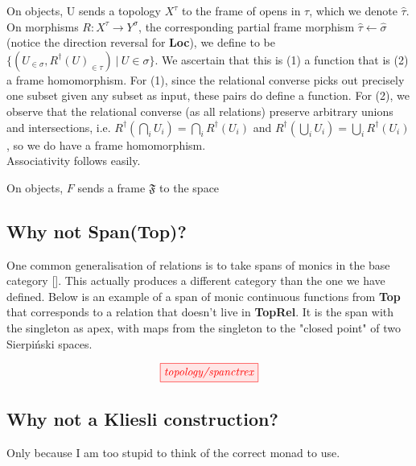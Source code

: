 \begin{defn}
On objects, U sends a topology $X^\tau$ to the frame of opens in $\tau$, which we denote $\hat{\tau}$.\\
On morphisms $R: X^\tau \rightarrow Y^\sigma$, the corresponding partial frame morphism $\hat{\tau} \leftarrow \hat{\sigma}$ (notice the direction reversal for \textbf{Loc}), we define to be $\{(U_{\in \sigma},R^\dagger(U)_{\in \tau}) \ | \ U \in \sigma\}$. We ascertain that this is (1) a function that is (2) a frame homomorphism. For (1), since the relational converse picks out precisely one subset given any subset as input, these pairs do define a function. For (2), we observe that the relational converse (as all relations) preserve arbitrary unions and intersections, i.e. $R^\dagger(\bigcap\limits_i U_i) = \bigcap\limits_i R^\dagger(U_i)$ and $R^\dagger(\bigcup\limits_i U_i) = \bigcup\limits_i R^\dagger(U_i)$, so we do have a frame homomorphism.\\
Associativity follows easily.
\end{defn}

\begin{defn}
On objects, $F$ sends a frame $\mathfrak{F}$ to the space
\end{defn}

\subsection{Why not Span(\textbf{Top})?}

One common generalisation of relations is to take spans of monics in the base category []. This actually produces a different category than the one we have defined. Below is an example of a span of monic continuous functions from \textbf{Top} that corresponds to a relation that doesn't live in \textbf{TopRel}. It is the span with the singleton as apex, with maps from the singleton to the "closed point" of two Sierpi\'{n}ski spaces.

\[\tikzfig{topology/spanctrex}\]

\subsection{Why not a Kliesli construction?}

Only because I am too stupid to think of the correct monad to use.